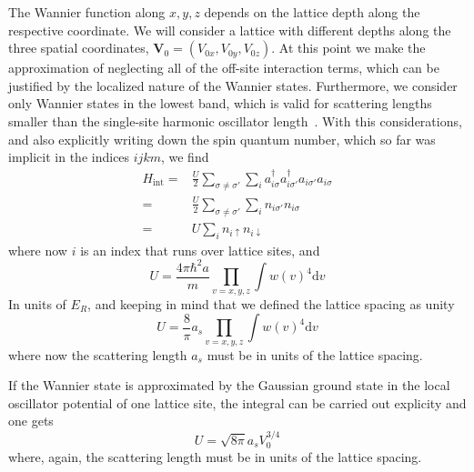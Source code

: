 \documentclass[11pt,letter]{article}
\newcommand{\bv}[1]{\ensuremath{\bm{#1}}}
\newcommand{\bvo}{\ensuremath{\bv{V}_{0}}}
\newcommand{\spup}{\ensuremath{ \uparrow }}
\newcommand{\spdn}{\ensuremath{ \downarrow}}
\begin{document}
The Wannier function along  $x,y,z$ depends on the lattice depth along the
respective coordinate.  We will consider a lattice with different depths along
the three spatial coordinates, $\bvo = ( V_{0x}, V_{0y}, V_{0z} ) $.  At this
point we make the approximation of neglecting all of the off-site interaction
terms, which can be justified by the localized nature of the Wannier states.
Furthermore, we consider only Wannier states in the lowest band, which is valid
for scattering lengths smaller than the single-site harmonic oscillator
length~\cite{Busch1998}.  With this considerations, and also explicitly writing down 
the spin quantum number, which so far was implicit in the indices $ijkm$, we find 
\begin{equation}
\begin{split}
   H_{\text{int}} = &  
           \frac{U}{2}\sum_{\sigma\neq\sigma'}\sum_{i} 
           a_{i\sigma}^{\dagger} a_{i\sigma'}^{\dagger} a_{i\sigma'} a_{i\sigma} \\
     = & 
           \frac{U}{2}\sum_{\sigma\neq\sigma'}\sum_{i}
           n_{i\sigma'} n_{i\sigma}  \\
     = & 
           U\sum_{i}
           n_{i\spup} n_{i\spdn}  
\end{split}
\end{equation}
where now $i$ is an index that runs over lattice sites, and  
\begin{equation}
  U = 
  \frac{ 4 \pi \hbar^{2} a } { m }
   \prod_{v=x,y,z}  \int  w(v) ^{4} \mathrm{d}v  
\end{equation}
In units of $E_{R}$, and keeping in mind that we defined the lattice spacing as
unity 
\begin{equation}
  U = \frac{ 8}{ \pi}   a_{s} 
   \prod_{v=x,y,z}  \int  w(v) ^{4} \mathrm{d}v  
\end{equation} where now the scattering length $a_{s}$ must be in units of the
lattice spacing.


If the Wannier state is approximated by the Gaussian ground state in the local
oscillator potential of one lattice site, the integral can be carried out
explicity and one gets
~\cite{Bloch2008} 
\begin{equation} 
  U  = \sqrt{ 8\pi } a_{s} V_{0}^{3/4} 
\end{equation} 
where, again, the scattering length must be in units of the lattice spacing.
\end{document}
